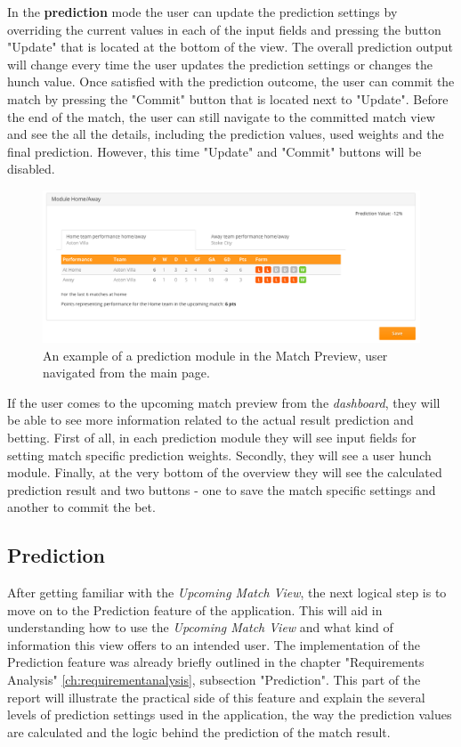 In the \textbf{prediction} mode the user can update the prediction settings by overriding the current values in each of the input fields and pressing the button "Update" that is located at the bottom of the view. The overall prediction output will change every time the user updates the prediction settings or changes the hunch value. Once satisfied with the prediction outcome, the user can commit the match by pressing the "Commit" button that is located next to "Update". Before the end of the match, the user can still navigate to the committed match view and see the all the details, including the prediction values, used weights and the final prediction. However, this time "Update" and "Commit" buttons will be disabled.

\begin{figure}[H]
	\begin{center}
		\includegraphics[width=.90\textwidth]{impl/images/matchoverviewex_from_main_page}
		\caption{An example of a prediction module in the Match Preview, user navigated from the main page.} \label{fig:using: matchoverviewex_from_main_page}
	\end{center}
\end{figure}

If the user comes to the upcoming match preview from the \emph{dashboard}, they will be able to see more information related to the actual result prediction and betting.
First of all, in each prediction module they will see input fields for setting match specific prediction weights. Secondly, they will see a user hunch module. Finally, at the very bottom of the overview they will see the calculated prediction result and two buttons - one to save the match specific settings and another to commit the bet.


\subsection{Prediction}
\label{subsec:prediction_implementation}
After getting familiar with the \emph{Upcoming Match View}, the next logical step is to move on to the Prediction feature of the application. This will aid in understanding how to use the \emph{Upcoming Match View} and what kind of information this view offers to an intended user. The implementation of the Prediction feature was already briefly outlined in the chapter "Requirements Analysis" \ref{ch:requirementanalysis}, subsection "Prediction". This part of the report will illustrate the practical side of this feature and explain the several levels of prediction settings used in the application, the way the prediction values are calculated and the logic behind the prediction of the match result.

